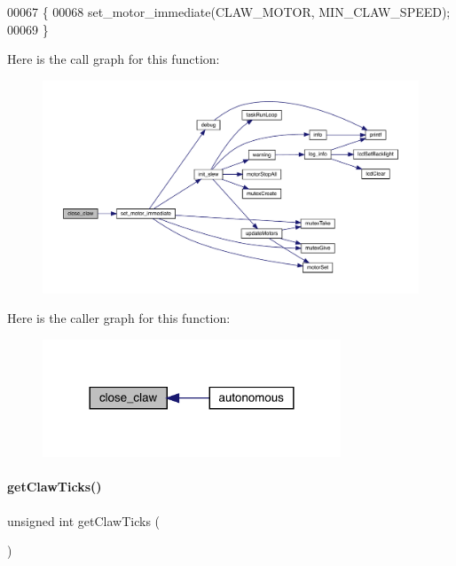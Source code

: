 \begin{DoxyCode}
00067                   \{
00068   set_motor_immediate(CLAW_MOTOR, MIN_CLAW_SPEED);
00069 \}
\end{DoxyCode}
Here is the call graph for this function\+:\nopagebreak
\begin{figure}[H]
\begin{center}
\leavevmode
\includegraphics[width=350pt]{claw_8h_ac42dd40dbb37219295286859c6b068c2_cgraph}
\end{center}
\end{figure}
Here is the caller graph for this function\+:\nopagebreak
\begin{figure}[H]
\begin{center}
\leavevmode
\includegraphics[width=252pt]{claw_8h_ac42dd40dbb37219295286859c6b068c2_icgraph}
\end{center}
\end{figure}
\mbox{\label{claw_8h_addd2004effae7c94400aed1fe6a90ead}} 
\paragraph{get\+Claw\+Ticks()}
{\footnotesize\ttfamily unsigned int get\+Claw\+Ticks (\begin{DoxyParamCaption}{ }\end{DoxyParamCaption})}



